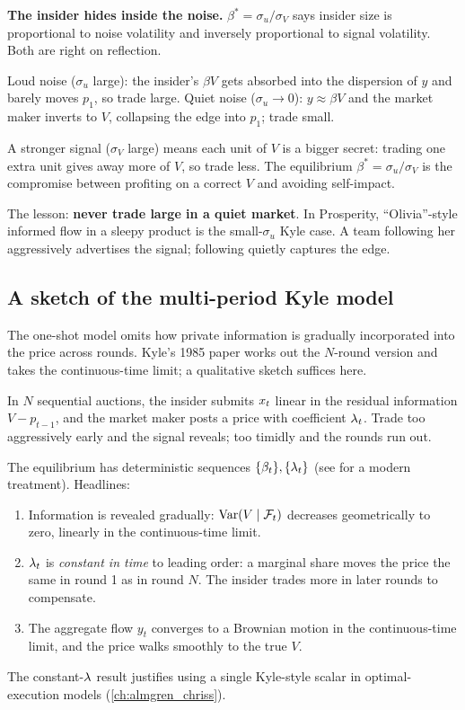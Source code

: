 \begin{intuitionbox}
\textbf{The insider hides inside the noise.} $\beta^\ast =
\sigma_u / \sigma_V$ says insider size is proportional to noise
volatility and inversely proportional to signal volatility. Both
are right on reflection.

Loud noise ($\sigma_u$ large): the insider's $\beta V$ gets
absorbed into the dispersion of $y$ and barely moves $p_1$, so
trade large. Quiet noise ($\sigma_u \to 0$): $y \approx \beta V$
and the market maker inverts to $V$, collapsing the edge into
$p_1$; trade small.

A stronger signal ($\sigma_V$ large) means each unit of $V$ is a
bigger secret: trading one extra unit gives away more of $V$, so
trade less. The equilibrium $\beta^\ast = \sigma_u/\sigma_V$ is
the compromise between profiting on a correct $V$ and avoiding
self-impact.

The lesson: \textbf{never trade large in a quiet market}. In
Prosperity, ``Olivia''-style informed flow in a sleepy product is
the small-$\sigma_u$ Kyle case. A team following her aggressively
advertises the signal; following quietly captures the edge.
\end{intuitionbox}

\subsection{A sketch of the multi-period Kyle model}
\label{subsec:kyle_multi}

The one-shot model omits how private information is gradually
incorporated into the price across rounds. Kyle's 1985 paper
\citeKyle{} works out the $N$-round version and takes the
continuous-time limit; a qualitative sketch suffices here.

In $N$ sequential auctions, the insider submits $x_t$ linear
in the residual information $V - p_{t-1}$, and the market maker
posts a price with coefficient $\lambda_t$. Trade too aggressively
early and the signal reveals; too timidly and the rounds run out.

The equilibrium has deterministic sequences $\{\beta_t\},
\{\lambda_t\}$ (see \citeCartea{} for a modern treatment). Headlines:
\begin{enumerate}
  \item Information is revealed gradually: $\operatorname{Var}(V \mid
  \mathcal{F}_t)$ decreases geometrically to zero, linearly in the
  continuous-time limit.
  \item $\lambda_t$ is \emph{constant in time} to leading order: a
  marginal share moves the price the same in round 1 as in round
  $N$. The insider trades more in later rounds to compensate.
  \item The aggregate flow $y_t$ converges to a Brownian motion
  in the continuous-time limit, and the price walks smoothly to
  the true $V$.
\end{enumerate}
The constant-$\lambda$ result justifies using a single Kyle-style
scalar in optimal-execution models (\cref{ch:almgren_chriss}).

